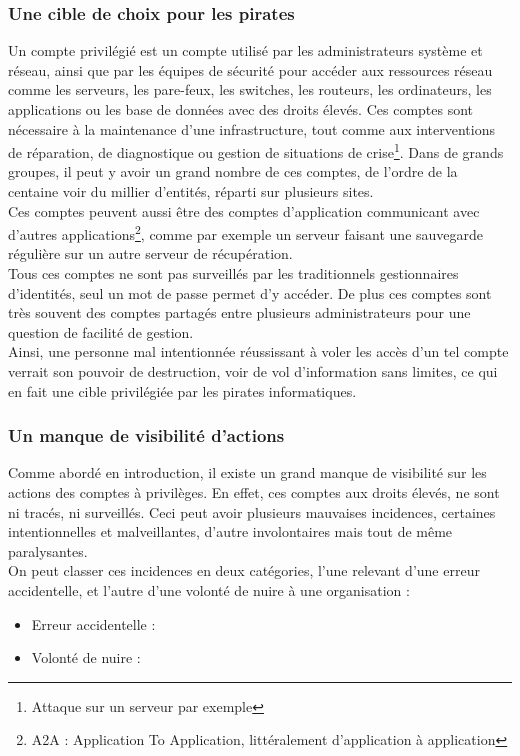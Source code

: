 \subsubsection{Une cible de choix pour les pirates}
Un compte privilégié est un compte utilisé par les administrateurs système et réseau, ainsi que par les équipes de sécurité pour accéder aux ressources réseau comme les serveurs, les pare-feux, les switches, les routeurs, les ordinateurs, les applications ou les base de données avec des droits élevés. Ces comptes sont nécessaire à la maintenance d'une infrastructure, tout comme aux interventions de réparation, de diagnostique ou gestion de situations de crise\footnote{Attaque sur un serveur par exemple}. Dans de grands groupes, il peut y avoir un grand nombre de ces comptes, de l'ordre de la centaine voir du millier d'entités, réparti sur plusieurs sites.\\
Ces comptes peuvent aussi être des comptes d'application communicant avec d'autres applications\footnote{A2A : Application To Application, littéralement d'application à application}, comme par exemple un serveur faisant une sauvegarde régulière sur un autre serveur de récupération.\\
Tous ces comptes ne sont pas surveillés par les traditionnels gestionnaires d'identités, seul un mot de passe permet d'y accéder. De plus ces comptes sont très souvent des comptes partagés entre plusieurs administrateurs pour une question de facilité de gestion.\\
Ainsi, une personne mal intentionnée réussissant à voler les accès d'un tel compte verrait son pouvoir de destruction, voir de vol d'information sans limites, ce qui en fait une cible privilégiée par les pirates informatiques.

\subsubsection{Un manque de visibilité d'actions} Comme abordé en introduction, il existe un grand manque de visibilité sur les actions des comptes à privilèges. En effet, ces comptes aux droits élevés, ne sont ni tracés, ni surveillés. Ceci peut avoir plusieurs mauvaises incidences, certaines intentionnelles et malveillantes, d'autre involontaires mais tout de même paralysantes.\\
On peut classer ces incidences en deux catégories, l'une relevant d'une erreur accidentelle, et l'autre d'une volonté de nuire à une organisation :
\begin{itemize}
	\item Erreur accidentelle :
	\item Volonté de nuire :
\end{itemize}

